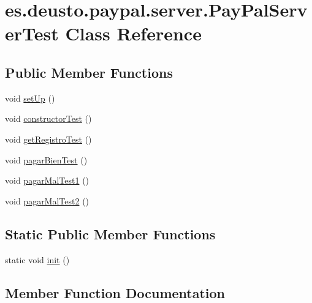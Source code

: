 \hypertarget{classes_1_1deusto_1_1paypal_1_1server_1_1_pay_pal_server_test}{}\section{es.\+deusto.\+paypal.\+server.\+Pay\+Pal\+Server\+Test Class Reference}
\label{classes_1_1deusto_1_1paypal_1_1server_1_1_pay_pal_server_test}
\subsection*{Public Member Functions}
\begin{DoxyCompactItemize}
\item 
void \mbox{\hyperlink{classes_1_1deusto_1_1paypal_1_1server_1_1_pay_pal_server_test_af004858da8832d32efc3540d23d7628b}{set\+Up}} ()
\item 
void \mbox{\hyperlink{classes_1_1deusto_1_1paypal_1_1server_1_1_pay_pal_server_test_ae33f460e3456aa34e940a7ad183d09f9}{constructor\+Test}} ()
\item 
void \mbox{\hyperlink{classes_1_1deusto_1_1paypal_1_1server_1_1_pay_pal_server_test_abfe8cff4619f7171aee7b5f9bd178007}{get\+Registro\+Test}} ()
\item 
void \mbox{\hyperlink{classes_1_1deusto_1_1paypal_1_1server_1_1_pay_pal_server_test_a9e1902b74437ca81267c3835cee58225}{pagar\+Bien\+Test}} ()
\item 
void \mbox{\hyperlink{classes_1_1deusto_1_1paypal_1_1server_1_1_pay_pal_server_test_a4d24130b0abf86d0c1cbaea7f9812569}{pagar\+Mal\+Test1}} ()
\item 
void \mbox{\hyperlink{classes_1_1deusto_1_1paypal_1_1server_1_1_pay_pal_server_test_a330df157ac91ec551cc3cb503d6a035c}{pagar\+Mal\+Test2}} ()
\end{DoxyCompactItemize}
\subsection*{Static Public Member Functions}
\begin{DoxyCompactItemize}
\item 
static void \mbox{\hyperlink{classes_1_1deusto_1_1paypal_1_1server_1_1_pay_pal_server_test_a4eff39c1e997fe5cdfedde518eba5ae2}{init}} ()
\end{DoxyCompactItemize}


\subsection{Member Function Documentation}
\mbox{\label{classes_1_1deusto_1_1paypal_1_1server_1_1_pay_pal_server_test_ae33f460e3456aa34e940a7ad183d09f9}} 
